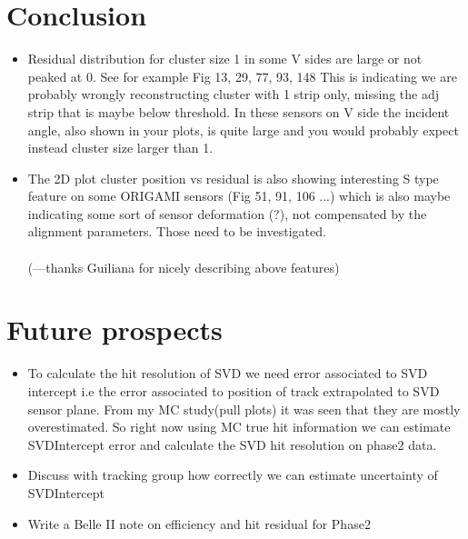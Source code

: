 \documentclass[12pt]{article}
\begin{document}
	\section{Conclusion}
	\begin{itemize}
		\item  Residual distribution for cluster size 1 in some V sides are large or not peaked at 0. See for example Fig 13, 29, 77, 93, 148
		This is indicating we are probably wrongly reconstructing cluster with 1 strip only, missing the adj strip that is maybe below threshold. In these sensors on V side the incident angle, also shown in your plots, is quite large and you would probably expect instead cluster size larger than 1. 
		
		\item  The 2D plot cluster position vs residual is also showing interesting S type feature on some ORIGAMI sensors (Fig 51, 91, 106 ...) which is also maybe indicating some sort of sensor deformation (?),  not compensated by the alignment parameters. Those need to be investigated.\\
		\\
		(---thanks Guiliana for nicely describing above features)
\end{itemize}
\section{Future prospects}
\begin{itemize}
\item
To calculate the hit resolution of SVD we need error associated to SVD intercept i.e the error associated to position of track extrapolated to SVD sensor plane. From my MC study(pull plots) it was seen that they are mostly overestimated. So right now using MC true hit information we can estimate SVDIntercept error and calculate the SVD  hit resolution on phase2 data.
\item Discuss with tracking group how correctly we can estimate uncertainty of SVDIntercept
\item Write a Belle II note on efficiency and hit residual for Phase2
\end{itemize}
\end{document}
